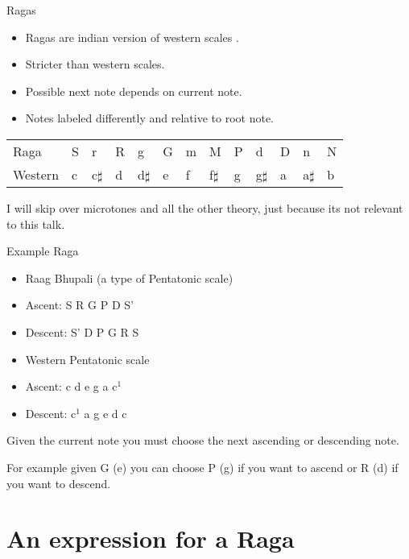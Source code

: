 \documentclass[10pt]{beamer}
\begin{document}
\begin{frame}{Ragas}
\begin{itemize}
\item Ragas are indian version of western scales \cite{Raga2011}.
\item Stricter than western scales.
\item Possible next note depends on current note.
\item Notes labeled differently and relative to root note.
\end{itemize}
\begin{center}
\begin{tabular}{l|llllllllllll}
Raga & S & r & R & g & G & m & M & P & d & D & n & N \\
Western & c & c$\sharp$ & d & d$\sharp$ & e & f & f$\sharp$ & g & g$\sharp$ & a & a$\sharp$ & b \\
\end{tabular}
\end{center}
I will skip over microtones and all the other theory, just because its not relevant to this talk.
\end{frame}

\begin{frame}{Example Raga}
\begin{itemize}
\item Raag Bhupali (a type of Pentatonic scale)
\item Ascent: S R G P D S'
\item Descent: S' D P G R S
\end{itemize}
\begin{itemize}
\item Western Pentatonic scale
\item Ascent: c d e g a c$^{1}$
\item Descent: c$^{1}$ a g e d c
\end{itemize}

Given the current note you must choose the next ascending or descending note.

For example given G (e) you can choose P (g) if you want to ascend or R (d) if you want to descend.
\end{frame}



\section{An expression for a Raga}
\end{document}
